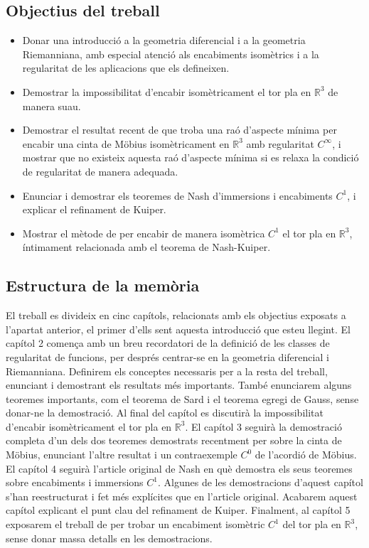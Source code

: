 \subsection*{Objectius del treball}
\begin{itemize}
    \item Donar una introducció a la geometria diferencial i a la geometria Riemanniana, amb especial atenció als encabiments isomètrics i a la regularitat de les aplicacions que els defineixen.
    \item Demostrar la impossibilitat d'encabir isomètricament el tor pla en $\mathbb R^3$ de manera suau.
    \item Demostrar el resultat recent de \cite{schwartz2024} que troba una raó d'aspecte mínima per encabir una cinta de Möbius isomètricament en $\mathbb R^3$ amb regularitat $C^\infty$, i mostrar que no existeix aquesta raó d'aspecte mínima si es relaxa la condició de regularitat de manera adequada.
    \item Enunciar i demostrar els teoremes de Nash d'immersions i encabiments $C^1$, i explicar el refinament de Kuiper.
    \item Mostrar el mètode de \cite{borrelli2013} per encabir de manera isomètrica $C^1$ el tor pla en $\mathbb R^3$, íntimament relacionada amb el teorema de Nash-Kuiper. 
\end{itemize}

\subsection*{Estructura de la mem\`oria}
El treball es divideix en cinc capítols, relacionats amb els objectius exposats a l'apartat anterior, el primer d'ells sent aquesta introducció que esteu llegint. El capítol 2 comença amb un breu recordatori de la definició de les classes de regularitat de funcions, per després centrar-se en la geometria diferencial i Riemanniana. Definirem els conceptes necessaris per a la resta del treball, enunciant i demostrant els resultats més importants. També enunciarem alguns teoremes importants, com el teorema de Sard i el teorema egregi de Gauss, sense donar-ne la demostració. Al final del capítol es discutirà la impossibilitat d'encabir isomètricament el tor pla en $\mathbb R^3$. El capítol 3 seguirà la demostració completa d'un dels dos teoremes demostrats recentment per \cite{schwartz2024} sobre la cinta de Möbius, enunciant l'altre resultat i un contraexemple $C^0$ de l'acordió de Möbius. El capítol 4 seguirà l'article original de Nash en què demostra els seus teoremes sobre encabiments i immersions $C^1$. Algunes de les demostracions d'aquest capítol s'han reestructurat i fet més explícites que en l'article original. Acabarem aquest capítol explicant el punt clau del refinament de Kuiper. Finalment, al capítol 5 exposarem el treball de \cite{borrelli2013} per trobar un encabiment isomètric $C^1$ del tor pla en $\mathbb R^3$, sense donar massa detalls en les demostracions. 
